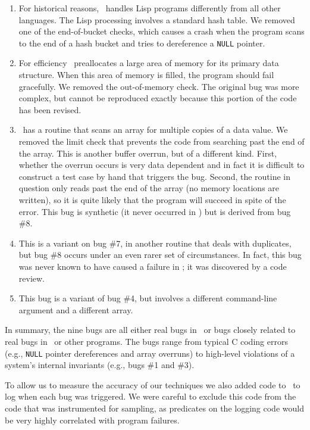 \begin{enumerate}
\item For historical reasons, \moss\ handles Lisp programs differently
from all other languages.  The Lisp processing involves a standard
hash table.  We removed one of the end-of-bucket checks, which
causes a crash when the program scans to the end of a hash bucket
and tries to dereference a \texttt{NULL} pointer.

\item For efficiency \moss\ preallocates a large area of memory for its primary data structure.
When this area of memory is filled, the program should fail
gracefully.  We removed the out-of-memory check.  The original bug
was more complex, but cannot be reproduced exactly because this
portion of the code has been revised.

\item \moss\ has a routine that scans an array for multiple copies of a data value.
We removed the limit check that prevents the code from searching past the end of the array.  This is another
buffer overrun, but of a different kind.  First, whether the overrun occurs is very data dependent and in fact it is
difficult to construct a test case by hand that triggers the bug.  Second, the routine in question only reads
past the end of the array (no memory locations are written), so it is quite likely that the program will
succeed in spite of the error.  This bug is synthetic (it never occurred in \moss) but is derived from bug \#8.

\item This is a variant on bug \#7, in another routine that deals with duplicates, but
bug \#8 occurs under an even rarer set of circumstances.  In
fact, this bug was never known to have caused a failure in \moss; it
was discovered by a code review.

\item This bug is a variant of bug \#4, but involves a different command-line argument and
a different array.
\end{enumerate}

In summary, the nine bugs are all either real bugs in \moss\ or bugs
closely related to real bugs in \moss\ or other programs.  The bugs
range from typical C coding errors (e.g., \texttt{NULL} pointer dereferences
and array overruns) to high-level violations of a system's internal
invariants (e.g., bugs \#1 and \#3).

To allow us to measure the accuracy of our techniques we also added code to \moss\ to
log when each bug was triggered.  We were careful to exclude this code from the
code that was instrumented for sampling, as predicates on the logging code would be
very highly correlated with program failures.

